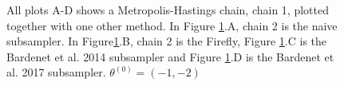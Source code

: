 \begin{figure}
    \caption{All plots A-D shows a Metropolis-Hastings chain, chain 1, plotted together with one other method. In Figure \ref{fig:compare_theta1}.A, chain 2 is the naive subsampler. In Figure\ref{fig:compare_theta1}.B, chain 2 is the Firefly, Figure \ref{fig:compare_theta1}.C is the Bardenet et al. 2014 subsampler and Figure \ref{fig:compare_theta1}.D is the Bardenet et al. 2017 subsampler. $\theta
   ^{\left(0\right)} = \left(-1,-2\right)$}%
    \label{fig:compare_theta1}%
\end{figure}

